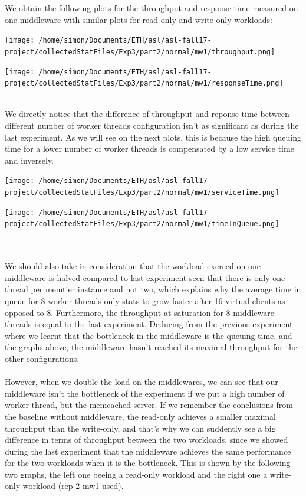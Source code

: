 \documentclass[11pt,a4paper]{article}
\begin{document}
We obtain the following plots for the throughput and response time measured on one middleware with similar plots for read-only and write-only workloads:
\\
\begin{minipage}{0.48\linewidth}
\texttt{[image: /home/simon/Documents/ETH/asl/asl-fall17-project/collectedStatFiles/Exp3/part2/normal/mw1/throughput.png]}
\end{minipage}
\hfill
\begin{minipage}{0.48\linewidth}
\texttt{[image: /home/simon/Documents/ETH/asl/asl-fall17-project/collectedStatFiles/Exp3/part2/normal/mw1/responseTime.png]}
\end{minipage}
\\
We directly notice that the difference of throughput and reponse time between different number of worker threads configuration isn't as significant as during the last experiment. As we will see on the next plots, this is because the high queuing time for a lower number of worker threads is compensated by a low service time and inversely. 
\\
\begin{minipage}{0.49\linewidth}
\texttt{[image: /home/simon/Documents/ETH/asl/asl-fall17-project/collectedStatFiles/Exp3/part2/normal/mw1/serviceTime.png]}
\end{minipage}
\hfill
\begin{minipage}{0.49\linewidth}
\texttt{[image: /home/simon/Documents/ETH/asl/asl-fall17-project/collectedStatFiles/Exp3/part2/normal/mw1/timeInQueue.png]}
\end{minipage}
\\\\ 
We should also take in consideration that the workload exerced on one middleware is halved compared to last experiment seen that there is only one thread per memtier instance and not two, which explains why the average time in queue for 8 worker threads only stats to grow faster after 16 virtual clients as opposed to 8. Furthermore, the throughput at saturation for 8 middleware threads is equal to the last experiment. 
Deducing from the previous experiment where we learnt that the bottleneck in the middleware is the queuing time, and the graphs above, the middleware hasn't reached its maximal throughput for the other configurations. 
\\\\
However, when we double the load on the middlewares, we can see that our middleware isn't the bottleneck of the experiment if we put a high number of worker thread, but the memcached server. If we remember the conclusions from the baseline without middleware, the read-only achieves a smaller maximal throughput than the write-only, and that's why we can suddently see a big difference in terms of throughput between the two workloads, since we showed during the last experiment that the middleware achieves the same performance for the two workloads when it is the bottleneck. This is shown by the following two graphs, the left one beeing a read-only workload and the right one a write-only workload (rep 2 mw1 used).   
\end{document}
